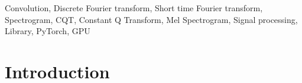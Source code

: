 \documentclass{ieeeaccess}
\newcommand{\newtext}[1]{\textcolor{black}{#1}} %
\begin{document}
\begin{keywords}
Convolution,
Discrete Fourier transform,
Short time Fourier transform,
Spectrogram,
CQT, 
Constant Q Transform,
Mel Spectrogram,
Signal processing, 
Library, 
PyTorch,
GPU
\end{keywords}

\titlepgskip=-15pt

\maketitle

\section{Introduction}
\label{sec:Introduction}
\end{document}
